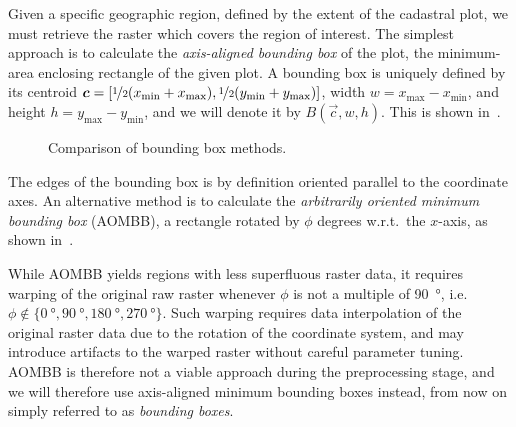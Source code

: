 Given a specific geographic region, defined by the extent of the cadastral plot, we must retrieve the raster which covers the region of interest.
The simplest approach is to calculate the \textit{axis-aligned bounding box} of the plot, the minimum-area enclosing rectangle of the given plot.
A bounding box is uniquely defined by its centroid $\vec{c} = [\nicefrac{1}{2}(x_{\mathrm{\min}} + x_{\mathrm{\max}}), \nicefrac{1}{2}(y_{\mathrm{\min}} + y_{\mathrm{\max}})]$, width $w = x_{\mathrm{\max}} - x_{\mathrm{\min}}$, and height $h = y_{\mathrm{\max}} - y_{\mathrm{\min}}$, and we will denote it by $B(\vec{c}, w, h)$.
This is shown in~.

\begin{figure}[htb]
  \captionsetup[subfigure]{position=b}
  \centering
  \hspace{2em}
  \caption{Comparison of bounding box methods.}
\end{figure}

The edges of the bounding box is by definition oriented parallel to the coordinate axes.
An alternative method is to calculate the \textit{arbitrarily oriented minimum bounding box} (AOMBB), a rectangle rotated by $\phi$ degrees w.r.t.\ the $x$-axis, as shown in~.

While AOMBB yields regions with less superfluous raster data, it requires warping of the original raw raster whenever $\phi$ is not a multiple of \SI{90}{\degree}, i.e.\ $\phi \not\in \{ \SI{0}{\degree}, \SI{90}{\degree}, \SI{180}{\degree}, \SI{270}{\degree} \}$.
Such warping requires data interpolation of the original raster data due to the rotation of the coordinate system, and may introduce artifacts to the warped raster without careful parameter tuning.
AOMBB is therefore not a viable approach during the preprocessing stage, and we will therefore use axis-aligned minimum bounding boxes instead, from now on simply referred to as \textit{bounding boxes}.

